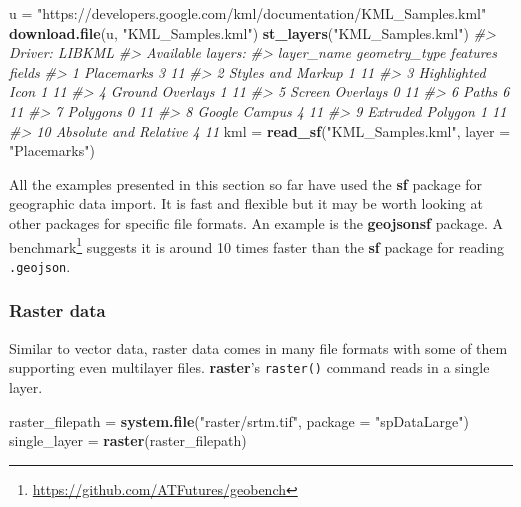 \documentclass[]{krantz}
\newenvironment{Shaded}{\begin{snugshade}}{\end{snugshade}}
\newcommand{\CommentTok}[1]{\textcolor[rgb]{0.37,0.37,0.37}{\textit{#1}}}
\newcommand{\DataTypeTok}[1]{\textcolor[rgb]{0.27,0.27,0.27}{#1}}
\newcommand{\KeywordTok}[1]{\textcolor[rgb]{0.27,0.27,0.27}{\textbf{#1}}}
\newcommand{\NormalTok}[1]{#1}
\newcommand{\StringTok}[1]{\textcolor[rgb]{0.5,0.5,0.5}{#1}}
\let\rmarkdownfootnote\footnote%
\def\footnote{\protect\rmarkdownfootnote}
\renewcommand{\href}[2]{#2\footnote{\url{#1}}}
\begin{document}
\begin{Shaded}
\begin{Highlighting}[]
\NormalTok{u =}\StringTok{ "https://developers.google.com/kml/documentation/KML_Samples.kml"}
\KeywordTok{download.file}\NormalTok{(u, }\StringTok{"KML_Samples.kml"}\NormalTok{)}
\KeywordTok{st_layers}\NormalTok{(}\StringTok{"KML_Samples.kml"}\NormalTok{)}
\CommentTok{#> Driver: LIBKML }
\CommentTok{#> Available layers:}
\CommentTok{#>               layer_name geometry_type features fields}
\CommentTok{#> 1             Placemarks                      3     11}
\CommentTok{#> 2      Styles and Markup                      1     11}
\CommentTok{#> 3       Highlighted Icon                      1     11}
\CommentTok{#> 4        Ground Overlays                      1     11}
\CommentTok{#> 5        Screen Overlays                      0     11}
\CommentTok{#> 6                  Paths                      6     11}
\CommentTok{#> 7               Polygons                      0     11}
\CommentTok{#> 8          Google Campus                      4     11}
\CommentTok{#> 9       Extruded Polygon                      1     11}
\CommentTok{#> 10 Absolute and Relative                      4     11}
\NormalTok{kml =}\StringTok{ }\KeywordTok{read_sf}\NormalTok{(}\StringTok{"KML_Samples.kml"}\NormalTok{, }\DataTypeTok{layer =} \StringTok{"Placemarks"}\NormalTok{)}
\end{Highlighting}
\end{Shaded}

All the examples presented in this section so far have used the \textbf{sf} package for geographic data import.
It is fast and flexible but it may be worth looking at other packages for specific file formats.
An example is the \textbf{geojsonsf} package.
A \href{https://github.com/ATFutures/geobench}{benchmark} suggests it is around 10 times faster than the \textbf{sf} package for reading \texttt{.geojson}.

\hypertarget{raster-data-1}{%
\subsubsection{Raster data}\label{raster-data-1}}

Similar to vector data, raster data comes in many file formats with some of them supporting even multilayer files.
\textbf{raster}'s \texttt{raster()} command reads in a single layer.

\begin{Shaded}
\begin{Highlighting}[]
\NormalTok{raster_filepath =}\StringTok{ }\KeywordTok{system.file}\NormalTok{(}\StringTok{"raster/srtm.tif"}\NormalTok{, }\DataTypeTok{package =} \StringTok{"spDataLarge"}\NormalTok{)}
\NormalTok{single_layer =}\StringTok{ }\KeywordTok{raster}\NormalTok{(raster_filepath)}
\end{Highlighting}
\end{Shaded}
\end{document}
